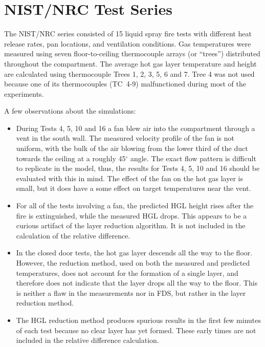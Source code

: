 \clearpage

\section{NIST/NRC Test Series}

The NIST/NRC series consisted of 15 liquid spray fire tests with different heat release rates, pan locations, and ventilation conditions.
Gas temperatures were measured using seven floor-to-ceiling
thermocouple arrays (or ``trees'') distributed throughout the compartment.  The average hot gas layer temperature and height are calculated using
thermocouple Trees 1, 2, 3, 5, 6 and 7. Tree 4 was not used because one of its thermocouples (TC~4-9) malfunctioned during most of the experiments.

A few observations about the simulations:
\begin{itemize}
\item During Tests 4, 5, 10 and 16 a fan blew air into the compartment through a vent in the south wall.
The measured velocity profile of the fan is not uniform, with the bulk of the air blowing from the lower third of the duct towards the ceiling at a
roughly 45$^\circ$ angle.  The exact flow pattern is difficult to replicate in the model, thus, the results for Tests 4, 5, 10 and 16 should be evaluated
with this in mind. The effect of the fan on the hot gas layer is small, but it does have a some effect on target temperatures near the vent.
\item For all of the tests involving a fan, the predicted HGL height rises after the fire is extinguished,
while the measured HGL drops.  This appears to be a curious artifact of the layer reduction algorithm. It is not included in the calculation of the
relative difference.
\item In the closed door tests, the hot gas layer descends all the way to the floor.
However, the reduction method, used on both the measured and predicted temperatures, does not account for the formation of a single layer, and
therefore does not indicate that the layer drops all the way to the floor. This is neither a flaw in the measurements nor in FDS, but rather in the
layer reduction method.
\item The HGL reduction method produces spurious results in the first few minutes of each test because no clear layer has yet formed.
These early times are not included in the relative difference calculation.
\end{itemize}


